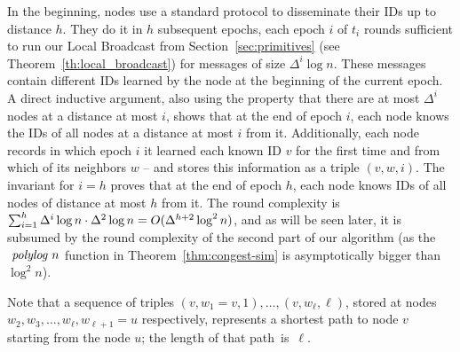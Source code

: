 In the beginning, 
nodes use a standard protocol to disseminate their IDs up to distance $h$. They do it in $h$ subsequent epochs, each epoch $i$ of $t_i$ rounds sufficient to run our  Local Broadcast from Section~\ref{sec:primitives} (see Theorem~\ref{th:local_broadcast}) for messages of size $\Delta^i\log n$.
These messages contain different IDs learned by the node at the beginning of the current epoch.
A direct inductive argument, also using the property that there are at most $\Delta^i$ nodes at a distance at most $i$, shows that at the end of epoch $i$, each node knows the IDs of all nodes at a distance at most $i$ from it.
Additionally, each node records in which epoch $i$ it learned each known ID $v$ for the first time and from which of its neighbors $w$ -- and stores this information as a triple $(v,w,i)$.
%
The invariant for $i=h$ proves that at the end of epoch $h$, each node knows IDs of all nodes of distance at most $h$ from it. The round complexity is %
$\sum_{i=1}^h \Delta^{i}\log n \cdot \Delta^2 \log n = O(\Delta^{h+2} \log^2 n)$, and as will be seen later, it is subsumed by the round complexity of the second part of our algorithm (as the $\text{\em\ polylog } n$ function in Theorem~\ref{thm:congest-sim} is asymptotically bigger than $\log^2 n$).

Note that a sequence of triples $(v,w_1=v,1),\ldots,(v,w_{\ell},\ell)$,
stored at nodes $w_2,w_3,\dots,w_\ell,w_{\ell+1}=u$ respectively, represents a shortest path to node $v$ starting from the node $u$; the length of that path~is~$\ell$.

